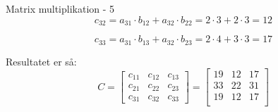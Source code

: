\documentclass{article}
\begin{document}
\begin{exercise}{Matrix multiplikation - 5}
	\hint
	\[
		c_{32} = a_{31} \cdot b_{12} + a_{32} \cdot b_{22} = 2 \cdot 3 + 2 \cdot 3 = 12
	\]

	\hint
	\[
		c_{33} = a_{31} \cdot b_{13} + a_{32} \cdot b_{23} = 2 \cdot 4 + 3 \cdot 3 = 17
	\]	
	
	
	
	\hint
	Resultatet er så:
	\[
	C = \left[\begin{array}{rrr}
	c_{11} & c_{12} & c_{13} \\
	c_{21} & c_{22} & c_{23} \\
	c_{31} & c_{32} & c_{33}
	\end{array} \right] = 
	\left[\begin{array}{rrr}
	19 & 12 & 17 \\
	33 & 22 & 31 \\
	19 & 12 & 17 \\
	\end{array} \right]
	\]
	
	
\end{exercise}

\newpage
\end{document}
